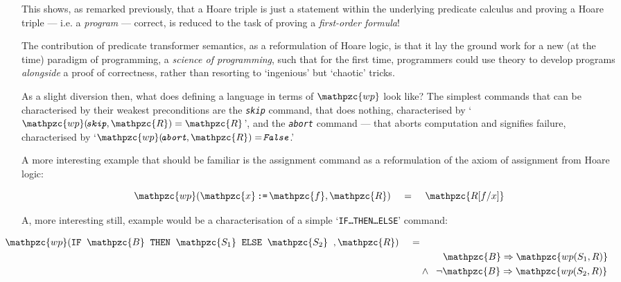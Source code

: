 \documentclass[oneside,12pt]{article}
\newcommand{\agdamath}[1]{\emph{\texttt{\!#1}}}
\newcommand{\impcode}[1]{\textsc{\texttt{#1}}}
\newcommand{\codevar}[1]{\ensuremath{\mathpzc{#1}}}
\newcommand{\textM}[1]{\ensuremath{\mathpzc{#1}}}
\begin{document}
This shows, as remarked previously, that a Hoare triple is just a statement within the underlying predicate calculus and proving a Hoare triple --- i.e. a \emph{program} --- correct, is reduced to the task of proving a \emph{first-order formula}! 

The contribution of predicate transformer semantics, as a reformulation of Hoare logic, is that it lay the ground work for a new (at the time) paradigm of programming, a \emph{science of programming}\cite{Gries81}, such that for the first time, programmers could use theory to develop programs \emph{alongside} a proof of correctness, rather than resorting to `ingenious' but `chaotic' tricks.

As a slight diversion then, what does defining a language in terms of \textM{wp} look like? The simplest commands that can be characterised by their weakest preconditions are the \agdamath{skip} command, that does nothing, characterised by `$\textM{wp}( \agdamath{skip}  ,\textM{R}) = \textM{R}$', and the \agdamath{abort} command --- that aborts computation and signifies failure, characterised by `$\textM{wp}( \agdamath{abort}  ,\textM{R})  = \agdamath{False}$.'

A more interesting example that should be familiar is the assignment command as a reformulation of the axiom of assignment from Hoare logic:

\begin{centering}
  \begin{equation}
    \label{eq:wp-assi}
    \textM{wp}(\codevar{x} \, \impcode{:=} \, \codevar{f},\textM{R}) \;\;\;\; = \;\;\;\; \textM{R[f/x]}
  \end{equation}
\end{centering}



A, more interesting still, example would be a characterisation of a simple `\impcode{IF\ldots THEN\ldots ELSE}' command:


\begin{centering}
  \begin{equation}
    \label{eq:wp-ifelse}
    \begin{aligned}
      \!\!\!\!\!\!\!\!\!\!\!\!\!\!\!\! \textM{wp}( \impcode{IF} \;\; \textM{B} \;\; \impcode{THEN} \;\; \textM{S_1} \;\; \impcode{ELSE} \;\; \textM{S_2} \;\; ,\textM{R}) \;\;\;\; =& \\
      & \;\;\,\;\;\;\;\;\;  \textM{B} \Rightarrow \textM{wp(S_1 , R)} \\
      & \wedge \;\; \neg  \textM{B} \Rightarrow \textM{wp(S_2 , R)}
    \end{aligned}
  \end{equation}
\end{centering} 
\end{document}

